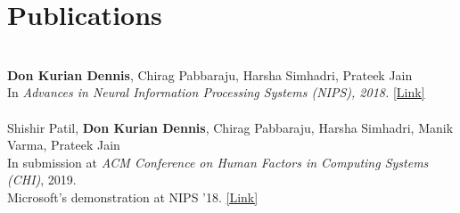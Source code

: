 \section{Publications}
\\
\textbf{Don Kurian Dennis}, Chirag Pabbaraju, Harsha Simhadri, Prateek Jain\\
In \textit{Advances in Neural Information Processing Systems (NIPS), 2018.} \href{https://dkdennis.xyz/publications/}{\footnotesize{[Link]}}\\[8px]
\\
Shishir Patil, \textbf{Don Kurian Dennis}, Chirag Pabbaraju, Harsha Simhadri, Manik Varma, Prateek Jain\\
In submission at \textit{ACM Conference on Human Factors in Computing Systems (CHI)}, 2019.
\\Microsoft's demonstration at NIPS '18.
\href{https://dkdennis.xyz/publications/}{\footnotesize{[Link]}}\\